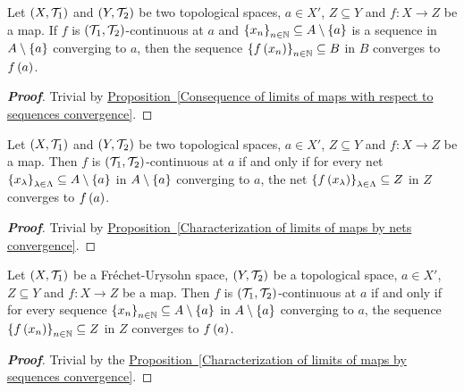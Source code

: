 \begin{corollary}
  Let $\left(X,\mathcal{T}_1\right)$ and $\left(Y,\mathcal{T}_2\right)$ be two topological spaces, $a\in X'$, $Z\subseteq Y$ and $f:X\rightarrow Z$ be a map. If $f$ is $\left(\mathcal{T}_1,\mathcal{T}_2\right)$-continuous at $a$ and $\left\{x_n\right\}_{n\in\mathbb{N}}\subseteq A\setminus\left\{a\right\}$ is a sequence in $A\setminus\left\{a\right\}$ converging to $a$, then the sequence $\left\{f\left(x_n\right)\right\}_{n\in\mathbb{N}}\subseteq B$ in $B$ converges to $f\left(a\right)$.
  \begin{proof}[\rm\textbf{Proof}]
    Trivial by \hyperref[Consequence of limits of maps with respect to sequences convergence]{Proposition~\ref*{Consequence of limits of maps with respect to sequences convergence}}.
  \end{proof}
\end{corollary}

\begin{corollary}
  Let $\left(X,\mathcal{T}_1\right)$ and $\left(Y,\mathcal{T}_2\right)$ be two topological spaces, $a\in X'$, $Z\subseteq Y$ and $f:X\rightarrow Z$ be a map. Then $f$ is $\left(\mathcal{T}_1,\mathcal{T}_2\right)$-continuous at $a$ if and only if for every net $\left\{x_\lambda\right\}_{\lambda\in\Lambda}\subseteq A\setminus\left\{a\right\}$ in $A\setminus\left\{a\right\}$ converging to $a$, the net $\left\{f\left(x_\lambda\right)\right\}_{\lambda\in\Lambda}\subseteq Z$ in $Z$ converges to $f\left(a\right)$.
  \begin{proof}[\rm\textbf{Proof}]
    Trivial by \hyperref[Characterization of limits of maps by nets convergence]{Proposition~\ref*{Characterization of limits of maps by nets convergence}}.
  \end{proof}
\end{corollary}

\begin{corollary}
  Let $\left(X,\mathcal{T}_1\right)$ be a Fréchet-Urysohn space, $\left(Y,\mathcal{T}_2\right)$ be a topological space, $a\in X'$, $Z\subseteq Y$ and $f:X\rightarrow Z$ be a map. Then $f$ is $\left(\mathcal{T}_1,\mathcal{T}_2\right)$-continuous at $a$ if and only if for every sequence $\left\{x_n\right\}_{n\in\mathbb{N}}\subseteq A\setminus\left\{a\right\}$ in $A\setminus\left\{a\right\}$ converging to $a$, the sequence $\left\{f\left(x_n\right)\right\}_{n\in\mathbb{N}}\subseteq Z$ in $Z$ converges to $f\left(a\right)$.
  \begin{proof}[\rm\textbf{Proof}]
    Trivial by the \hyperref[Characterization of limits of maps by sequences convergence]{Proposition~\ref*{Characterization of limits of maps by sequences convergence}}.
  \end{proof}
\end{corollary}

